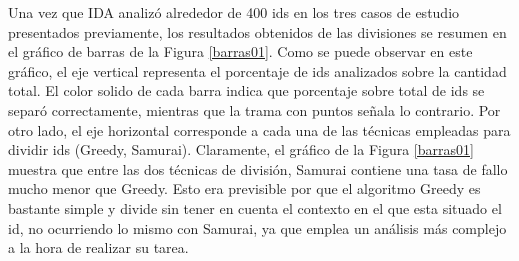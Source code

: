 Una vez que IDA analizó alrededor de 400 ids en los tres casos de estudio presentados previamente, los resultados obtenidos de las divisiones se resumen en el gráfico de barras de la Figura \ref{barras01}. Como se puede observar en este gráfico, el eje vertical representa el porcentaje de ids analizados sobre la cantidad total. El color solido de cada barra indica que porcentaje sobre total de ids se separó correctamente, mientras que la trama con puntos señala lo contrario. Por otro lado, el eje horizontal corresponde a cada una de las técnicas empleadas para dividir ids (Greedy, Samurai).
Claramente, el gráfico de la Figura \ref{barras01} muestra que entre las dos técnicas de división, Samurai contiene una tasa de fallo mucho menor que Greedy. Esto era previsible por que el algoritmo Greedy es bastante simple y divide sin tener en cuenta el contexto en el que esta situado el id, no ocurriendo lo mismo con Samurai, ya que emplea un análisis más complejo a la hora de realizar su tarea.

